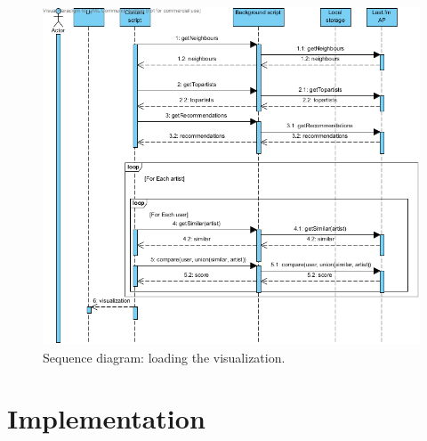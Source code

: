 \begin{figure}%
	\begin{center}
		\includegraphics[width=\columnwidth]{img/seq_load_visualization}%
	\end{center}
	\caption{Sequence diagram: loading the visualization.}%
	\label{fig:sequence:loadingvis}%
\end{figure}



\section{Implementation}\label{chapter:implementation:section:implementation}








